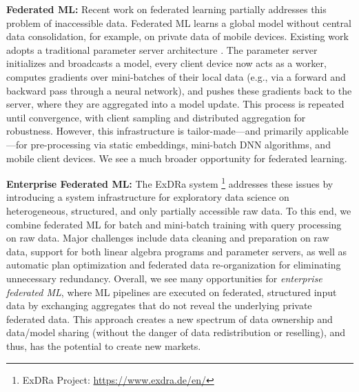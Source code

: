 \documentclass[sigconf,screen]{acmart}
\begin{document}
\textbf{Federated ML:} Recent work on federated learning \cite{BonawitzEGHIIKK19} partially addresses this problem of inaccessible data. Federated ML learns a global model without central data consolidation, for example, on private data of mobile devices. Existing work adopts a traditional parameter server architecture \cite{SmolaN10,DeanCMCDLMRSTYN12,LiAPSAJLSS14,JiangCZY17}. The parameter server initializes and broadcasts a model, every client device now acts as a worker, computes gradients over mini-batches of their local data (e.g., via a forward and backward pass through a neural network), and pushes these gradients back to the server, where they are aggregated into a model update. This process is repeated until convergence, with client sampling and distributed aggregation for robustness. However, this infrastructure is tailor-made---and primarily applicable---for pre-processing via static embeddings, mini-batch DNN algorithms, and mobile client devices. We see a much broader opportunity for federated learning.

\textbf{Enterprise Federated ML:} The ExDRa system \footnote{ExDRa Project: \url{https://www.exdra.de/en/}} addresses these issues by introducing a system infrastructure for exploratory data science on heterogeneous, structured, and only partially accessible raw data. To this end, we combine federated ML for batch and mini-batch training with query processing on raw data. Major challenges include data cleaning and preparation on raw data, support for both linear algebra programs and parameter servers, as well as automatic plan optimization and federated data re-organization for eliminating unnecessary redundancy. Overall, we see many opportunities for \emph{enterprise federated ML}, where ML pipelines are executed on federated, structured input data by exchanging aggregates that do not reveal the underlying private federated data. This approach creates a new spectrum of data ownership and data/model sharing (without the danger of data redistribution or reselling), and thus, has the potential to create new markets.
\end{document}
